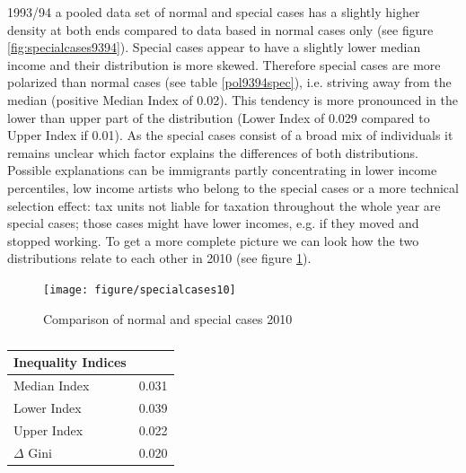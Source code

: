 \documentclass[twoside]{article}\usepackage[]{graphicx}\usepackage[]{color}
\newenvironment{knitrout}{}{} %
\begin{document}
\begin{multicols}{2}
\begin{table}[H]
\end{table}


1993/94 a pooled data set of normal and special cases has a slightly higher density at both ends compared to data based in normal cases only (see figure \ref{fig:specialcases9394}). Special cases appear to have a slightly lower median income and their distribution is more skewed. Therefore special cases are more polarized than normal cases (see table \ref{pol9394spec}), i.e. striving away from the median (positive Median Index of 0.02). This tendency is more pronounced in the lower than upper part  of the distribution (Lower Index of 0.029 compared to Upper Index if 0.01). 
As the special cases consist of a broad mix of individuals it remains unclear which factor explains the differences of both distributions. Possible explanations can be immigrants partly concentrating in lower income percentiles, low income artists who belong to the special cases or a more technical selection effect: tax units not liable for taxation throughout the whole year are special cases; those cases might have lower incomes, e.g. if they moved and stopped working. To get a more complete picture we can look how the two distributions relate to each other in 2010 (see figure \ref{fig:specialcases10}).



\begin{knitrout}
\color{fgcolor}\begin{figure}[H]

\texttt{[image: figure/specialcases10]} \caption[Comparison of normal and special cases 2010]{Comparison of normal and special cases 2010\label{fig:specialcases10}}
\end{figure}


\end{knitrout}

\begin{table}[H]
\caption{\label{pol2010spec}} 
\begin{center}
\begin{tabular}{ll}
\hline\hline
\multicolumn{1}{l}{Inequality Indices}&\multicolumn{1}{c}{}\tabularnewline
\hline
Median Index&0.031\tabularnewline
Lower Index&0.039\tabularnewline
Upper Index&0.022\tabularnewline
$\Delta$ Gini&0.020\tabularnewline
\hline
\end{tabular}\end{center}


\end{table}
\end{multicols}
\end{document}
